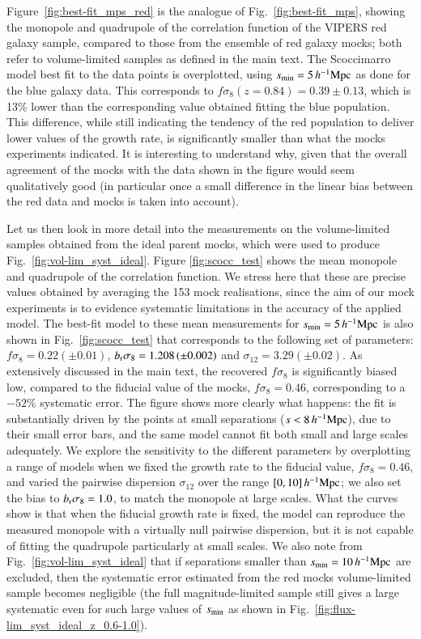 \documentclass[longauth]{aa}
\def\({\left(}
\def\){\right)}
\def\mhmpc{\,h^{-1}{\rm Mpc}}
\begin{document}
Figure~\ref{fig:best-fit_mps_red} is the analogue of Fig.~\ref{fig:best-fit_mps}, showing the monopole and quadrupole of the correlation function of the VIPERS red galaxy sample, compared to those from the ensemble of red galaxy mocks; both refer to volume-limited samples as defined in the main text.  The Scoccimarro model best fit to the data points is overplotted, using $s_{\rm{min}}=5\mhmpc$ as done for the blue galaxy data.  This corresponds to $f\sigma_8\(z=0.84\) = 0.39\pm0.13$, which is 13\% lower than the corresponding value obtained fitting the blue population. This difference, while still indicating the tendency of the red population to deliver lower values of the growth rate, is significantly smaller than what the mocks experiments indicated. It is interesting to understand why, given that the overall agreement of the mocks with the data shown in the figure would seem qualitatively good (in particular once a small difference in the linear bias between the red data and mocks is taken into account). 

Let us then look in more detail into the measurements on the volume-limited samples obtained from the ideal parent mocks, which were used to produce Fig.~\ref{fig:vol-lim_syst_ideal}. Figure \ref{fig:scocc_test} shows the mean monopole and quadrupole of the correlation function. We stress here that these are precise values obtained by averaging the 153 mock realisations, since the aim of our mock experiments is to evidence systematic limitations in the accuracy of the applied model. The best-fit model to these mean measurements for $s_{\rm{min}}=5\mhmpc$ is also shown in Fig.~\ref{fig:scocc_test} that corresponds to the following set of parameters: $f\sigma_8=0.22\left(\pm0.01\right)$, $b_{\rm{r}}\sigma_8=1.208\left(\pm0.002\right)$ and $\sigma_{12}=3.29\left(\pm0.02\right)$.  As extensively discussed in the main text, the recovered $f\sigma_8$ is significantly biased low, compared to the fiducial value of the mocks, $f\sigma_8=0.46$, corresponding to a $-52\%$ systematic error. The figure shows  more clearly what happens: the fit is substantially driven by the points at small separations ($s<8\mhmpc$), due to their small error bars, and the same model cannot fit both small and large scales adequately.  We explore the sensitivity to the different parameters by overplotting a range of models when we fixed the growth rate to the fiducial value, $f\sigma_8=0.46$, and varied the pairwise dispersion $\sigma_{12}$ over the range $[0,10] \mhmpc$; we also set the bias to $b_{\rm{r}}\sigma_8=1.0$, to match the monopole at large scales.  What the curves show is that when the fiducial growth rate is fixed, the model can reproduce the measured monopole with a virtually null pairwise dispersion, but it is not capable of fitting the quadrupole particularly at small scales.  We also note from Fig.~\ref{fig:vol-lim_syst_ideal} that if separations smaller than $s_{\rm{min}}=10\mhmpc$ are excluded, then the systematic error estimated from the red mocks volume-limited sample becomes negligible (the full magnitude-limited sample still gives a large systematic even for such large values of $s_{\rm{min}}$ as shown in Fig.~\ref{fig:flux-lim_syst_ideal_z_0.6-1.0}).
\end{document}
